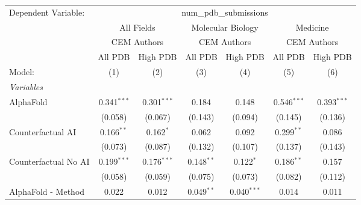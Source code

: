 \begingroup
\centering
\begin{tabular}{lcccccc}
   \tabularnewline \midrule \midrule
   Dependent Variable: & \multicolumn{6}{c}{num\_pdb\_submissions}\\
 & \multicolumn{2}{c}{All Fields} & \multicolumn{2}{c}{Molecular Biology} & \multicolumn{2}{c}{Medicine} \\
\cmidrule(lr){2-3} \cmidrule(lr){4-5} \cmidrule(lr){6-7}
 & \multicolumn{2}{c}{CEM Authors} & \multicolumn{2}{c}{CEM Authors} & \multicolumn{2}{c}{CEM Authors} \\
\cmidrule(lr){2-3} \cmidrule(lr){4-5} \cmidrule(lr){6-7}
 & \multicolumn{1}{c}{All PDB} & \multicolumn{1}{c}{High PDB} & \multicolumn{1}{c}{All PDB} & \multicolumn{1}{c}{High PDB} & \multicolumn{1}{c}{All PDB} & \multicolumn{1}{c}{High PDB} \\
\cmidrule(lr){2-2} \cmidrule(lr){3-3} \cmidrule(lr){4-4} \cmidrule(lr){5-5} \cmidrule(lr){6-6} \cmidrule(lr){7-7}
   Model:                                                     & (1)           & (2)           & (3)          & (4)            & (5)           & (6)\\  
   \midrule
   \emph{Variables}\\
   AlphaFold                                                  & 0.341$^{***}$ & 0.301$^{***}$ & 0.184        & 0.148          & 0.546$^{***}$ & 0.393$^{***}$\\   
                                                              & (0.058)       & (0.067)       & (0.143)      & (0.094)        & (0.145)       & (0.136)\\   
   Counterfactual AI                                          & 0.166$^{**}$  & 0.162$^{*}$   & 0.062        & 0.092          & 0.299$^{**}$  & 0.086\\   
                                                              & (0.073)       & (0.087)       & (0.132)      & (0.107)        & (0.137)       & (0.143)\\   
   Counterfactual No AI                                       & 0.199$^{***}$ & 0.176$^{***}$ & 0.148$^{**}$ & 0.122$^{*}$    & 0.186$^{**}$  & 0.157\\   
                                                              & (0.058)       & (0.059)       & (0.075)      & (0.073)        & (0.082)       & (0.112)\\   
   AlphaFold - Method                                         & 0.022         & 0.012         & 0.049$^{**}$ & 0.040$^{***}$  & 0.014         & 0.011\\   

\end{tabular}
